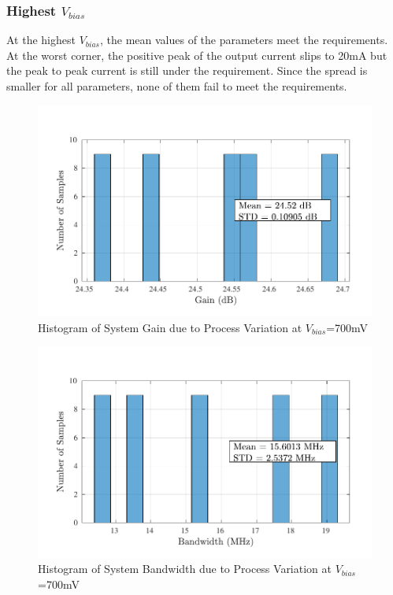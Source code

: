 \subsubsection{Highest $V_{bias}$}
At the highest $V_{bias}$, the mean values of the parameters meet the requirements. At the worst corner, the positive peak of the output current slips to 20mA but the peak to peak current is still under the requirement. Since the spread is smaller for all parameters, none of them fail to meet the requirements.
\begin{figure} [H]
\centering
\includegraphics[scale=1]{Figures/Corners/Overall/Proc_Max/PDFs/Proc_Max_gain.pdf}
\caption{Histogram of System Gain due to Process Variation at $V_{bias}$=700mV}
\end{figure}

\begin{figure} [H]
\centering
\includegraphics[scale=1]{Figures/Corners/Overall/Proc_Max/PDFs/Proc_Max_bw.pdf}
\caption{Histogram of System Bandwidth due to Process Variation at $V_{bias}$=700mV}
\end{figure}

